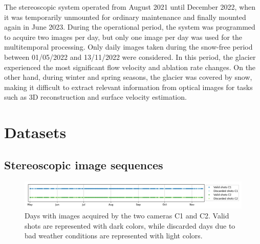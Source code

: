 

The stereoscopic system operated from August 2021 until December 2022, when it was temporarily unmounted for ordinary maintenance and finally mounted again in June 2023.
During the operational period, the system was programmed to acquire two images per day, but only one image per day was used for the multitemporal processing.
Only daily images taken during the snow-free period between 01/05/2022 and 13/11/2022 were considered.
In this period, the glacier experienced the most significant flow velocity and ablation rate changes. 
On the other hand, during winter and spring seasons, the glacier was covered by snow, making it difficult to extract relevant information from optical images for tasks such as 3D reconstruction and surface velocity estimation.

\section{Datasets}\label{sec:4:datasets}




\subsection{Stereoscopic image sequences}\label{sec:4:stereo}

\begin{figure}[ht!]
  \centering
  \includegraphics[width=162mm]{4_discardes_shots.png}
  \caption{Days with images acquired by the two cameras C1 and C2. Valid shots are
    represented with dark colors, while discarded days due to bad weather conditions are
    represented with light colors.}
  \label{fig:4:discardes_shots}
\end{figure}

